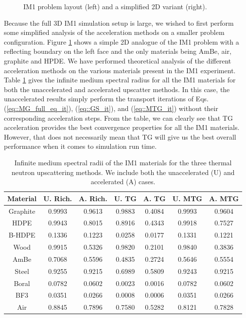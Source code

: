 \documentclass[11pt]{article}
\begin{document}
\begin{figure}
\begin{subfigure}[b]{0.375\textwidth}
		\caption{}
		\label{fig::IM1_layouts_b}
	\end{subfigure}
\caption{IM1 problem layout (left) and a simplified 2D variant (right).}
\label{fig::IM1_layouts}
\end{figure} 

Because the full 3D IM1 simulation setup is large, we wished to first perform some simplified analysis of the acceleration methods on a smaller problem configuration. Figure \ref{fig::IM1_layouts_b} shows a simple 2D analogue of the IM1 problem with a reflecting boundary on the left face and the only materials being AmBe, air, graphite and HPDE. We have performed theoretical analysis of the different acceleration methods on the various materials present in the IM1 experiment. Table \ref{tab::IM1_inf_med_SR} gives the infinite medium spectral radius for all the IM1 materials for both the unaccelerated and accelerated upscatter methods. In this case, the unaccelerated results simply perform the transport iterations of Eqs. (\ref{eq::MG_full_eq_it}), (\ref{eq::GS_it}), and (\ref{eq::MTG_it}) without their corresponding acceleration steps. From the table, we can clearly see that TG acceleration provides the best convergence properties for all the IM1 materials. However, that does not necessarily mean that TG will give us the best overall performance when it comes to simulation run time.


\begin{table}
\caption{Infinite medium spectral radii of the IM1 materials for the three thermal neutron upscattering methods. We include both the unaccelerated (U) and accelerated (A) cases.}
\centering
\def\arraystretch{1.2}
\begin{tabular}{|c||c|c||c|c||c|c|}
\hline
Material & U. Rich. & A. Rich. & U. TG & A. TG & U. MTG & A. MTG \\ \hline
Graphite & 0.9993 & 0.9613 & 0.9883 &0.4084 & 0.9993 & 0.9604 \\
HDPE & 0.9943 & 0.8015 & 0.8916 & 0.4343&  0.9918 & 0.7527 \\
B-HDPE &0.1336 & 0.1223  & 0.0258 & 0.0177 &  0.1331 & 0.1221 \\
Wood & 0.9915 & 0.5326  & 0.9820 & 0.2101 &  0.9840 & 0.3836 \\
AmBe  & 0.7068 & 0.5596 & 0.4835& 0.2724 & 0.5646 & 0.5554 \\
Steel  & 0.9255 & 0.9215 & 0.6989 & 0.5809 &   0.9243 & 0.9215\\
Boral  & 0.0782 & 0.0602 & 0.0023 & 0.0016 & 0.0782 & 0.0602 \\
BF3   & 0.0351 & 0.0266 & 0.0008& 0.0006 & 0.0351 & 0.0266 \\
Air   & 0.8845 & 0.7896 & 0.7580& 0.5282 &  0.8121 & 0.7828 \\
\hline
\end{tabular}
\label{tab::IM1_inf_med_SR}
\end{table}
\end{document}
